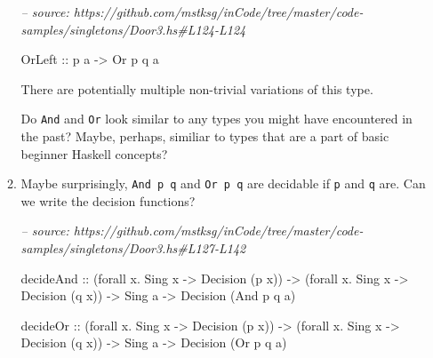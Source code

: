 \documentclass[]{article}
\newenvironment{Shaded}{}{}
\newcommand{\CommentTok}[1]{\textcolor[rgb]{0.38,0.63,0.69}{\textit{#1}}}
\newcommand{\DataTypeTok}[1]{\textcolor[rgb]{0.56,0.13,0.00}{#1}}
\newcommand{\FunctionTok}[1]{\textcolor[rgb]{0.02,0.16,0.49}{#1}}
\newcommand{\NormalTok}[1]{#1}
\newcommand{\OtherTok}[1]{\textcolor[rgb]{0.00,0.44,0.13}{#1}}
\begin{document}
\begin{enumerate}
\begin{enumerate}
\begin{Shaded}
\begin{Highlighting}[]
\CommentTok{-- source: https://github.com/mstksg/inCode/tree/master/code-samples/singletons/Door3.hs#L124-L124}

    \DataTypeTok{OrLeft}\OtherTok{  ::}\NormalTok{ p a }\OtherTok{->} \DataTypeTok{Or}\NormalTok{ p q a}
\end{Highlighting}
\end{Shaded}

    There are potentially multiple non-trivial variations of this type.

    Do \texttt{And} and \texttt{Or} look similar to any types you might have
    encountered in the past? Maybe, perhaps, similiar to types that are a part
    of basic beginner Haskell concepts?
  \item
    Maybe surprisingly, \texttt{And\ p\ q} and \texttt{Or\ p\ q} are decidable
    if \texttt{p} and \texttt{q} are. Can we write the decision functions?

\begin{Shaded}
\begin{Highlighting}[]
\CommentTok{-- source: https://github.com/mstksg/inCode/tree/master/code-samples/singletons/Door3.hs#L127-L142}

\NormalTok{decideAnd}
\OtherTok{    ::}\NormalTok{ (forall x}\FunctionTok{.} \DataTypeTok{Sing}\NormalTok{ x }\OtherTok{->} \DataTypeTok{Decision}\NormalTok{ (p x))}
    \OtherTok{->}\NormalTok{ (forall x}\FunctionTok{.} \DataTypeTok{Sing}\NormalTok{ x }\OtherTok{->} \DataTypeTok{Decision}\NormalTok{ (q x))}
    \OtherTok{->} \DataTypeTok{Sing}\NormalTok{ a}
    \OtherTok{->} \DataTypeTok{Decision}\NormalTok{ (}\DataTypeTok{And}\NormalTok{ p q a)}

\NormalTok{decideOr}
\OtherTok{    ::}\NormalTok{ (forall x}\FunctionTok{.} \DataTypeTok{Sing}\NormalTok{ x }\OtherTok{->} \DataTypeTok{Decision}\NormalTok{ (p x))}
    \OtherTok{->}\NormalTok{ (forall x}\FunctionTok{.} \DataTypeTok{Sing}\NormalTok{ x }\OtherTok{->} \DataTypeTok{Decision}\NormalTok{ (q x))}
    \OtherTok{->} \DataTypeTok{Sing}\NormalTok{ a}
    \OtherTok{->} \DataTypeTok{Decision}\NormalTok{ (}\DataTypeTok{Or}\NormalTok{ p q a)}
\end{Highlighting}
\end{Shaded}


\end{enumerate}
\end{enumerate}
\end{document}
